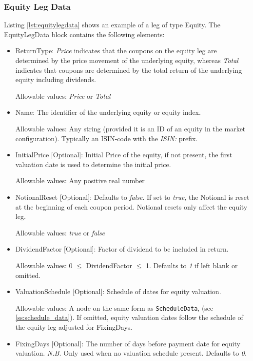 \subsubsection{Equity Leg Data}
\label{ss:equitylegdata}

Listing \ref{lst:equitylegdata} shows an example of a leg of type Equity. The EquityLegData block contains the following
elements:

\begin{itemize}
\item ReturnType: \emph{Price} indicates that the coupons on the equity leg are determined by the price movement of the underlying equity, whereas  \emph{Total} indicates that coupons are determined by the total return of the underlying equity including dividends.

Allowable values:  \emph{Price} or  \emph{Total}

\item Name: The identifier of the underlying equity or equity index.
 
 Allowable values: Any string (provided it is an ID of an equity in the market configuration). Typically an ISIN-code with the \emph{ISIN:} prefix.

\item InitialPrice [Optional]: Initial Price of the equity, if not present, the first valuation date is used to determine the initial price.

Allowable values: Any positive real number

\item NotionalReset [Optional]: Defaults to \emph{false}. If set to \emph{true}, the Notional is reset at the beginning of each coupon period. Notional resets only affect the equity leg.

Allowable values:  \emph{true} or  \emph{false}

\item DividendFactor [Optional]: Factor of dividend to be included in return. 

Allowable values: 0 $\leq$ DividendFactor $\leq$  1.   Defaults to \emph{1} if left blank or omitted.

\item ValuationSchedule [Optional]: Schedule of dates for equity valuation.

Allowable values: A node on the same form as \lstinline!ScheduleData!, (see \ref{ss:schedule_data}). If omitted, equity valuation dates follow the schedule of the equity leg adjusted for FixingDays.

\item FixingDays [Optional]: The number of days before payment date for equity valuation. \emph{N.B.} Only used when no valuation schedule present. Defaults to \emph{0}.

\end{itemize} 

